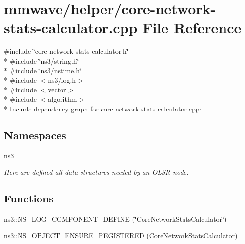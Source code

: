 \hypertarget{core-network-stats-calculator_8cpp}{}\section{mmwave/helper/core-\/network-\/stats-\/calculator.cpp File Reference}
\label{core-network-stats-calculator_8cpp}
{\ttfamily \#include \char`\"{}core-\/network-\/stats-\/calculator.\+h\char`\"{}}\\*
{\ttfamily \#include \char`\"{}ns3/string.\+h\char`\"{}}\\*
{\ttfamily \#include \char`\"{}ns3/nstime.\+h\char`\"{}}\\*
{\ttfamily \#include $<$ns3/log.\+h$>$}\\*
{\ttfamily \#include $<$vector$>$}\\*
{\ttfamily \#include $<$algorithm$>$}\\*
Include dependency graph for core-\/network-\/stats-\/calculator.cpp\+:
\subsection*{Namespaces}
\begin{DoxyCompactItemize}
\item 
 \hyperlink{namespacens3}{ns3}
\begin{DoxyCompactList}\small\item\em Here are defined all data structures needed by an O\+L\+SR node. \end{DoxyCompactList}\end{DoxyCompactItemize}
\subsection*{Functions}
\begin{DoxyCompactItemize}
\item 
\hyperlink{namespacens3_acfb56cc8bac87d5e9afd1332c70e0b5c}{ns3\+::\+N\+S\+\_\+\+L\+O\+G\+\_\+\+C\+O\+M\+P\+O\+N\+E\+N\+T\+\_\+\+D\+E\+F\+I\+NE} (\char`\"{}Core\+Network\+Stats\+Calculator\char`\"{})
\item 
\hyperlink{namespacens3_aea03a5a99765263c2906b53300a8d17c}{ns3\+::\+N\+S\+\_\+\+O\+B\+J\+E\+C\+T\+\_\+\+E\+N\+S\+U\+R\+E\+\_\+\+R\+E\+G\+I\+S\+T\+E\+R\+ED} (Core\+Network\+Stats\+Calculator)
\end{DoxyCompactItemize}
